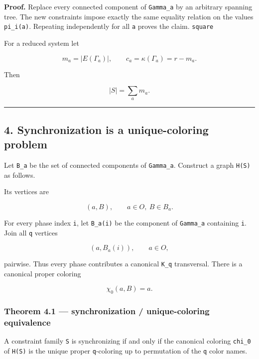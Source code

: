 \textbf{Proof.} Replace every connected component of \texttt{Gamma\_a}
by an arbitrary spanning tree. The new constraints impose exactly the
same equality relation on the values \texttt{pi\_i(a)}. Repeating
independently for all \texttt{a} proves the claim. \texttt{square}

For a reduced system let

\[
m_a=|E(\Gamma_a)|,
\qquad
c_a=\kappa(\Gamma_a)=r-m_a.
\tag{9}
\]

Then

\[
|S|=\sum_a m_a.
\tag{10}
\]

\begin{center}\rule{0.5\linewidth}{0.5pt}\end{center}

\hypertarget{synchronization-is-a-unique-coloring-problem}{%
\subsection{4. Synchronization is a unique-coloring
problem}\label{synchronization-is-a-unique-coloring-problem}}

Let \texttt{B\_a} be the set of connected components of
\texttt{Gamma\_a}. Construct a graph \texttt{H(S)} as follows.

Its vertices are

\[
(a,B),\qquad a\in O,\ B\in B_a.
\tag{11}
\]

For every phase index \texttt{i}, let \texttt{B\_a(i)} be the component
of \texttt{Gamma\_a} containing \texttt{i}. Join all \texttt{q} vertices

\[
(a,B_a(i)),\qquad a\in O,
\tag{12}
\]

pairwise. Thus every phase contributes a canonical \texttt{K\_q}
transversal. There is a canonical proper coloring

\[
\chi_0(a,B)=a.
\tag{13}
\]

\hypertarget{theorem-4.1-synchronization-unique-coloring-equivalence}{%
\subsubsection{Theorem 4.1 --- synchronization / unique-coloring
equivalence}\label{theorem-4.1-synchronization-unique-coloring-equivalence}}

A constraint family \texttt{S} is synchronizing if and only if the
canonical coloring \texttt{chi\_0} of \texttt{H(S)} is the unique proper
\texttt{q}-coloring up to permutation of the \texttt{q} color names.

